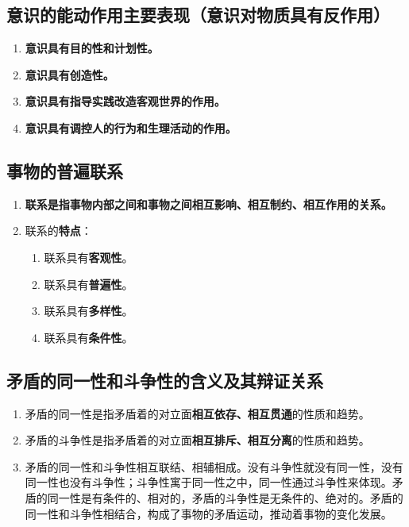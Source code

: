 \documentclass[12pt, a4paper, oneside]{ctexbook}
\begin{document}
\subsection{意识的能动作用主要表现（意识对物质具有反作用）}

\begin{enumerate}
\item \textbf{意识具有目的性和计划性。}
\item \textbf{意识具有创造性。}
\item \textbf{意识具有指导实践改造客观世界的作用。}
\item \textbf{意识具有调控人的行为和生理活动的作用。}
\end{enumerate}

\subsection{事物的普遍联系}

\begin{enumerate}
\item \textbf{联系是指事物内部之间和事物之间相互影响、相互制约、相互作用的关系。}
\item 联系的\textbf{特点}：
\begin{enumerate}
\item 联系具有\textbf{客观性}。
\item 联系具有\textbf{普遍性}。
\item 联系具有\textbf{多样性}。
\item 联系具有\textbf{条件性}。
\end{enumerate}
\end{enumerate}

\subsection{矛盾的同一性和斗争性的含义及其辩证关系}

\begin{enumerate}
\item 矛盾的同一性是指矛盾着的对立面\textbf{相互依存、相互贯通}的性质和趋势。
\item 矛盾的斗争性是指矛盾着的对立面\textbf{相互排斥、相互分离}的性质和趋势。
\item 矛盾的同一性和斗争性相互联结、相辅相成。没有斗争性就没有同一性，没有同一性也没有斗争性；斗争性寓于同一性之中，同一性通过斗争性来体现。矛盾的同一性是有条件的、相对的，矛盾的斗争性是无条件的、绝对的。矛盾的同一性和斗争性相结合，构成了事物的矛盾运动，推动着事物的变化发展。
\end{enumerate}
\end{document}
